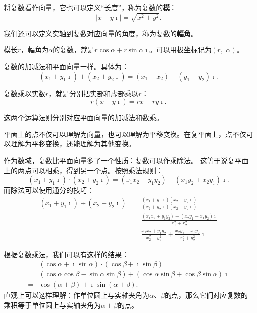 \documentclass[12pt,UTF8]{ctexbook}
\theoremstyle{definition}
\theoremstyle{plain}
\begin{document}
将复数看作向量，它也可以定义“长度”，称为复数的\textbf{模}：
$$ |x + y\imath| = \sqrt{x^2 + y^2}.$$

我们还可以定义实轴到复数对应向量的角度，称为复数的\textbf{幅角}。

模长$r$，幅角为$\alpha$的复数，就是$r\cos{\alpha} + r\sin{\alpha}\imath$。可以用极坐标记为$(r,\,\,\alpha)$。

复数的加减法和平面向量一样。具体为：
$$ (x_1 + y_1\imath) \pm (x_2 + y_2\imath) = (x_1 \pm x_2) + (y_1 \pm y_2)\imath. $$

复数乘以实数$r$，就是分别把实部和虚部乘以$r$：
$$ r(x + y\imath) = rx + ry\imath. $$

这两个运算法则分别对应平面向量的加减法和数乘。

平面上的点不仅可以理解为向量，也可以理解为平移变换。在复平面上，点不仅可以理解为平移变换，还能理解为其他变换。

作为数域，复数比平面向量多了一个性质：复数可以作乘除法。
这等于说复平面上的两点可以相乘，得到另一个点。按照乘法规则：
$$ (x_1 + y_1\imath) \cdot (x_2 + y_2\imath) = (x_1x_2 - y_1y_2) + (x_1y_2 + x_2y_1)\imath. $$
而除法可以使用通分的技巧：
\begin{align*}
    (x_1 + y_1\imath) \div (x_2 + y_2\imath) &= \frac{(x_1 + y_1\imath)(x_2 - y_2\imath)}{(x_2 + y_2\imath)(x_2 - y_2\imath)} \\
    &= \frac{(x_1x_2 + y_1y_2) + (x_2y_1 - x_1y_2)\imath}{x_1^2 + x_2^2} \\
    &= \frac{x_1x_2 + y_1y_2}{x_2^2 + y_2^2} + \frac{x_2y_1 - x_1y_2}{x_2^2 + y_2^2}\imath
\end{align*}

根据复数乘法，我们可以有这样的结果：
\begin{align*}
     & (\cos{\alpha} + \imath\sin{\alpha}) \cdot (\cos{\beta} + \imath\sin{\beta}) \\
    =& (\cos{\alpha}\cos{\beta} - \sin{\alpha}\sin{\beta}) + (\cos{\alpha}\sin{\beta} + \cos{\beta}\sin{\alpha})\imath \\
    =& \cos{(\alpha + \beta)} + \imath\sin{(\alpha + \beta)}.
\end{align*}
直观上可以这样理解：作单位圆上与实轴夹角为$\alpha$、$\beta$的点，那么它们对应复数的乘积等于单位圆上与实轴夹角为$\alpha+\beta$的点。
\end{document}
